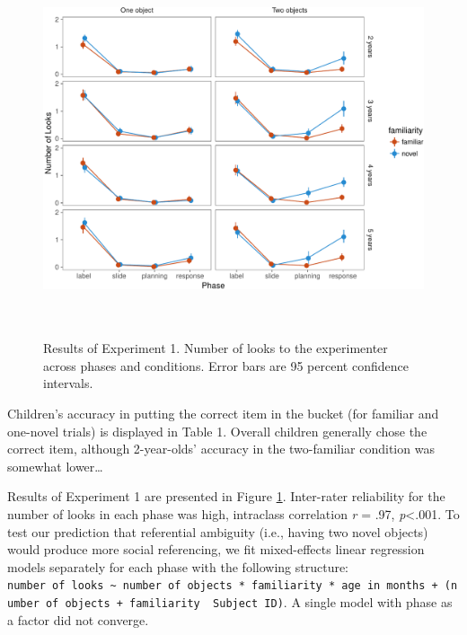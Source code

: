 \documentclass[10pt, letterpaper]{article}
\newenvironment{CodeChunk}{}{}
\begin{document}
\begin{CodeChunk}
\begin{figure}[h]

{\centering \includegraphics[width=5.75in,height=4.35in]{figs/results_e1-1} 

}

\caption[Results of Experiment 1]{Results of Experiment 1. Number of looks to the experimenter across phases and conditions. Error bars are 95 percent confidence intervals.}\label{fig:results_e1}
\end{figure}
\end{CodeChunk}

Children's accuracy in putting the correct item in the bucket (for
familiar and one-novel trials) is displayed in Table 1. Overall children
generally chose the correct item, although 2-year-olds' accuracy in the
two-familiar condition was somewhat lower\ldots{}

Results of Experiment 1 are presented in Figure \ref{fig:results_e1}.
Inter-rater reliability for the number of looks in each phase was high,
intraclass correlation \emph{r} = .97, \emph{p}\textless{}.001. To test
our prediction that referential ambiguity (i.e., having two novel
objects) would produce more social referencing, we fit mixed-effects
linear regression models separately for each phase with the following
structure:
\texttt{number\ of\ looks\ \textasciitilde{}\ number\ of\ objects\ *\ familiarity\ *\ age\ in\ months\ +\ (number\ of\ objects\ +\ familiarity\ \textbar{}\ Subject\ ID)}.
A single model with phase as a factor did not converge.
\end{document}

